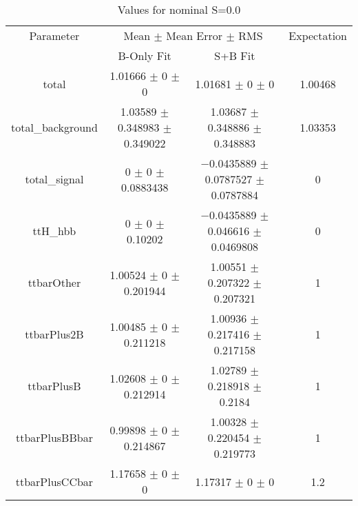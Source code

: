 \begin{table}
\centering
\caption{Values for nominal S=0.0}
\begin{tabular}{cccc}
\toprule
Parameter & \multicolumn{2}{c}{Mean $\pm$ Mean Error $\pm$ RMS} & Expectation\\
 & B-Only Fit & S+B Fit & \\
\midrule
total & \num{1.01666} $\pm$ \num{0} $\pm$ \num{0} & \num{1.01681} $\pm$ \num{0} $\pm$ \num{0} & \num{1.00468}\\
total\_background & \num{1.03589} $\pm$ \num{0.348983} $\pm$ \num{0.349022} & \num{1.03687} $\pm$ \num{0.348886} $\pm$ \num{0.348883} & \num{1.03353}\\
total\_signal & \num{0} $\pm$ \num{0} $\pm$ \num{0.0883438} & \num{-0.0435889} $\pm$ \num{0.0787527} $\pm$ \num{0.0787884} & \num{0}\\
ttH\_hbb & \num{0} $\pm$ \num{0} $\pm$ \num{0.10202} & \num{-0.0435889} $\pm$ \num{0.046616} $\pm$ \num{0.0469808} & \num{0}\\
ttbarOther & \num{1.00524} $\pm$ \num{0} $\pm$ \num{0.201944} & \num{1.00551} $\pm$ \num{0.207322} $\pm$ \num{0.207321} & \num{1}\\
ttbarPlus2B & \num{1.00485} $\pm$ \num{0} $\pm$ \num{0.211218} & \num{1.00936} $\pm$ \num{0.217416} $\pm$ \num{0.217158} & \num{1}\\
ttbarPlusB & \num{1.02608} $\pm$ \num{0} $\pm$ \num{0.212914} & \num{1.02789} $\pm$ \num{0.218918} $\pm$ \num{0.2184} & \num{1}\\
ttbarPlusBBbar & \num{0.99898} $\pm$ \num{0} $\pm$ \num{0.214867} & \num{1.00328} $\pm$ \num{0.220454} $\pm$ \num{0.219773} & \num{1}\\
ttbarPlusCCbar & \num{1.17658} $\pm$ \num{0} $\pm$ \num{0} & \num{1.17317} $\pm$ \num{0} $\pm$ \num{0} & \num{1.2}\\
\bottomrule
\end{tabular}
\end{table}